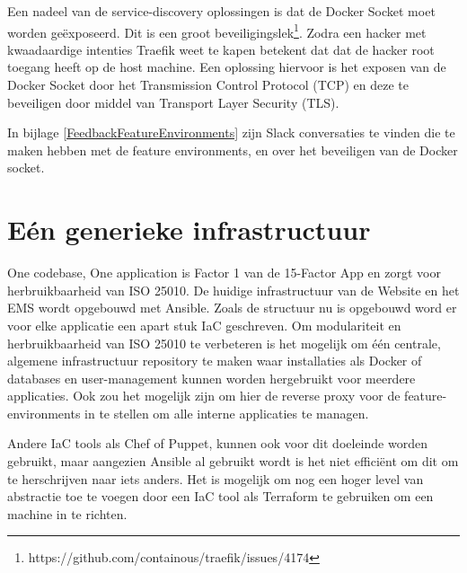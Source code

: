 Een nadeel van de service-discovery oplossingen is dat de Docker Socket moet worden geëxposeerd. Dit is een groot beveiligingslek\footnote{https://github.com/containous/traefik/issues/4174}. Zodra een hacker met kwaadaardige intenties Traefik weet te kapen betekent dat dat de hacker root toegang heeft op de host machine. Een oplossing hiervoor is het exposen van de Docker Socket door het Transmission Control Protocol (TCP) en deze te beveiligen door middel van Transport Layer Security (TLS).

In bijlage \ref{FeedbackFeatureEnvironments} zijn Slack conversaties te vinden die te maken hebben met de feature environments, en over het beveiligen van de Docker socket.

\section{Eén generieke infrastructuur}
One codebase, One application is Factor 1 van de 15-Factor App en zorgt voor herbruikbaarheid van ISO 25010. De huidige infrastructuur van de Website en het EMS wordt opgebouwd met Ansible. Zoals de structuur nu is opgebouwd word er voor elke applicatie een apart stuk IaC geschreven. Om modulariteit en herbruikbaarheid van ISO 25010 \parencite{ISO25010} te verbeteren is het mogelijk om één centrale, algemene infrastructuur repository te maken waar installaties als Docker of databases en user-management kunnen worden hergebruikt voor meerdere applicaties. Ook zou het mogelijk zijn om hier de reverse proxy voor de feature-environments in te stellen om alle interne applicaties te managen.

Andere IaC tools als Chef of Puppet, kunnen ook voor dit doeleinde worden gebruikt, maar aangezien Ansible al gebruikt wordt is het niet efficiënt om dit om te herschrijven naar iets anders. Het is mogelijk om nog een hoger level van abstractie toe te voegen door een IaC tool als Terraform te gebruiken om een machine in te richten.

